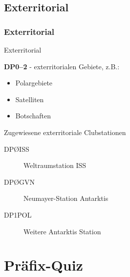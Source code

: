 \subsection{Exterritorial}

\begin{frame}
  \frametitle{Exterritorial}

  {\Large Exterritorial}

  \textbf{DP0--2} - exterritorialen Gebiete, z.B.:

  \begin{itemize}
    \item Polargebiete
    \item Satelliten
    \item Botschaften
  \end{itemize}

  \begin{exampleblock}{Zugewiesene exterritoriale Clubstationen}
    \begin{description}
      \item[DPØISS] Weltraumstation ISS
      \item[DPØGVN] Neumayer-Station Antarktis
      \item[DP1POL] Weitere Antarktis Station
    \end{description}
  \end{exampleblock}

\end{frame}



\section[]{Präfix-Quiz}

